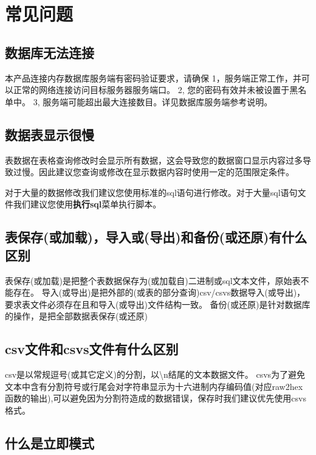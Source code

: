 \section{常见问题}\label{problems}

\linespread{1.2}
\large
\subsection{数据库无法连接}
本产品连接内存数据库服务端有密码验证要求，请确保
1，服务端正常工作，并可以正常的网络连接访问目标服务器服务端口。
2, 您的密码有效并未被设置于黑名单中。
3, 服务端可能超出最大连接数目。详见数据库服务端参考说明。

\subsection{数据表显示很慢}
\bigskip

表数据在表格查询修改时会显示所有数据，这会导致您的数据窗口显示内容过多导致过慢。因此建议您查询或修改在显示数据内容时使用一定的范围限定条件。

对于大量的数据修改我们建议您使用标准的sql语句进行修改。对于大量sql语句文件我们建议您使用\textbf{执行sql}菜单执行脚本。

\subsection{表保存(或加载)，导入或(导出)和备份(或还原)有什么区别}
\bigskip

表保存(或加载)是把整个表数据保存为(或加载自)二进制或sql文本文件，原始表不能存在。
导入(或导出)是把外部的(或表的部分查询)csv/csvs数据导入(或导出)，要求表文件必须存在且和导入(或导出)文件结构一致。
备份(或还原)是针对数据库的操作，是把全部数据表保存(或还原)

\subsection{csv文件和csvs文件有什么区别}
\bigskip

csv是以常规逗号(或其它定义)的分割，以\textbackslash n结尾的文本数据文件。
csvs为了避免文本中含有分割符号或行尾会对字符串显示为十六进制内存编码值(对应raw2hex函数的输出),可以避免因为分割符造成的数据错误，保存时我们建议优先使用csvs格式。

\subsection{什么是立即模式}
\bigskip

